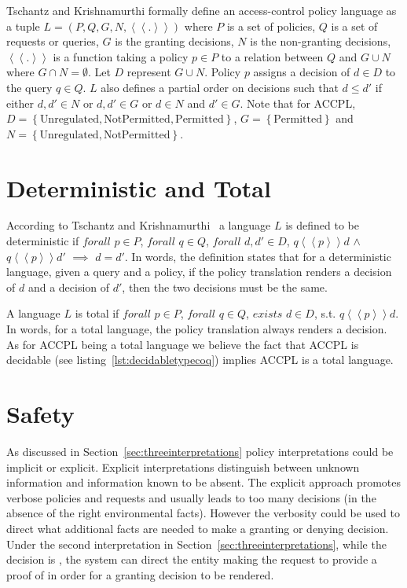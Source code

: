 Tschantz and Krishnamurthi formally define an access-control policy language as a tuple $L = (P, Q, G, N, \left\langle\left\langle . \right\rangle\right\rangle)$ where $P$ is a set of policies, $Q$ is a set of requests or queries, $G$ is the granting decisions, $N$ is the non-granting decisions, $\left\langle\left\langle . \right\rangle\right\rangle$ is a function taking a policy $p \in P$ to a relation between $Q$ and $G \cup N$ where $G \cap N = \emptyset$. Let $D$ represent $G \cup N$. Policy $p$ assigns a decision of $d \in D$ to the query $q \in Q$. $L$ also defines a partial order on decisions such that $d \leq d'$ if either $d, d' \in N$ or $d, d' \in G$ or $d \in N$ and $d' \in G$. Note that for \ac{ACCPL}, $D = \left\{ {\text{Unregulated}, \text{NotPermitted}, \text{Permitted}}\right\}$, $G = \left\{ {\text{Permitted}}\right\}$ and $N = \left\{ {\text{Unregulated}, \text{NotPermitted}}\right\}$.





\section{Deterministic and Total}

According to Tschantz and Krishnamurthi~\cite{Tschantz} a language $L$ is defined to be deterministic if $forall$ $p \in P$, $forall$ $q \in Q$, $forall$ $d, d' \in D$, $q \left\langle\left\langle p  \right\rangle\right\rangle d$ $\land$ $q \left\langle\left\langle p  \right\rangle\right\rangle d'$ $\implies$ $d = d'$. In words, the definition states that for a deterministic language, given a query and a policy, if the policy translation renders a decision of $d$ and a decision of $d'$, then the two decisions must be the same.

A language $L$ is total if $forall$ $p \in P$, $forall$ $q \in Q$, $exists$ $d \in D$, s.t. $q \left\langle\left\langle p  \right\rangle\right\rangle d$. In words, for a total language, the policy translation always renders a decision. As for \ac{ACCPL} being a total language we believe the fact that \ac{ACCPL} is decidable (see listing~\ref{lst:decidabletypecoq}) implies \ac{ACCPL} is a total language.


\section{Safety}

As discussed in Section~\ref{sec:threeinterpretations} policy interpretations could be implicit or explicit. Explicit interpretations distinguish between unknown information and information known to be absent. The explicit approach promotes verbose policies and requests and usually leads to too many  decisions (in the absence of the right environmental facts). However the verbosity could be used to direct what additional facts are needed to make a granting or denying decision. Under the second interpretation in Section~\ref{sec:threeinterpretations}, while the decision is , the system can direct the entity making the request to provide a proof of  in order for a granting decision to be rendered. 

